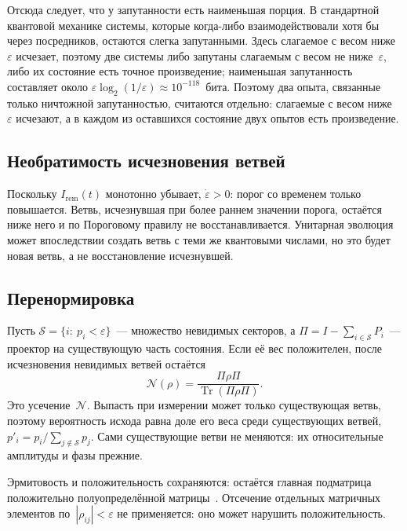 \documentclass[11pt,a4paper]{article}
\newcommand{\Ost}{I_{\mathrm{rem}}}
\newcommand{\Sinv}{\mathcal{S}}
\newcommand{\CollapseRuleD}{Пороговому правилу}
\begin{document}
Отсюда следует, что у запутанности есть наименьшая порция. В стандартной квантовой механике системы, которые когда-либо взаимодействовали хотя бы через посредников, остаются слегка запутанными. Здесь слагаемое с весом ниже~$\varepsilon$ исчезает, поэтому две системы либо запутаны слагаемым с весом не ниже~$\varepsilon$, либо их состояние есть точное произведение; наименьшая запутанность составляет около $\varepsilon\log_2(1/\varepsilon)\approx10^{-118}$~бита. Поэтому два опыта, связанные только ничтожной запутанностью, считаются отдельно: слагаемые с весом ниже~$\varepsilon$ исчезают, а в каждом из оставшихся состояние двух опытов есть произведение.

\subsection{Необратимость исчезновения ветвей}
\label{sec:irreversible}

Поскольку $\Ost(t)$ монотонно убывает, $\dot\varepsilon>0$: порог со временем только повышается. Ветвь, исчезнувшая при более раннем значении порога, остаётся ниже него и по \CollapseRuleD{} не восстанавливается. Унитарная эволюция может впоследствии создать ветвь с теми же квантовыми числами, но это будет новая ветвь, а не восстановление исчезнувшей.

\subsection{Перенормировка}
\label{sec:renorm}

Пусть $\Sinv=\{i:\ p_i<\varepsilon\}$~--- множество невидимых секторов, а $\Pi=I-\sum_{i\in \Sinv}P_i$~--- проектор на существующую часть состояния. Если её вес положителен, после исчезновения невидимых ветвей остаётся
\begin{equation}
\mathcal{N}(\rho)
=\frac{\Pi\rho \Pi}{\operatorname{Tr}(\Pi\rho \Pi)}.
\end{equation}
Это усечение~$\mathcal N$. Выпасть при измерении может только существующая ветвь, поэтому вероятность исхода равна доле его веса среди существующих ветвей, $p'_i=p_i/\sum_{j\notin \Sinv}p_j$. Сами существующие ветви не меняются: их относительные амплитуды и фазы прежние.

Эрмитовость и положительность сохраняются: остаётся главная подматрица положительно полуопределённой матрицы~\cite{hornjohnson2013}. Отсечение отдельных матричных элементов по~$|\rho_{ij}|<\varepsilon$ не применяется: оно может нарушить положительность.
\end{document}
